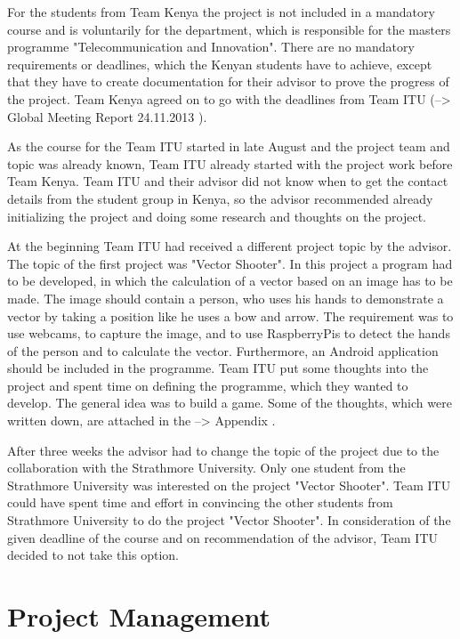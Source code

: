 For the students from Team Kenya the project is not included in a mandatory course and is voluntarily for the department, which is responsible for the masters programme "Telecommunication and Innovation". There are no mandatory requirements or deadlines, which the Kenyan students have to achieve, except that they have to create documentation for their advisor to prove the progress of the project. Team Kenya agreed on to go with the deadlines from Team ITU (--> Global Meeting Report 24.11.2013 ).

As the course for the Team ITU started in late August and the project team and topic was already known, Team ITU already started with the project work before Team Kenya. Team ITU and their advisor did not know when to get the contact details from the student group in Kenya, so the advisor recommended already initializing the project and doing some research and thoughts on the project.

At the beginning Team ITU had received a different project topic by the advisor. The topic of the first project was "Vector Shooter". In this project a program had to be developed, in which the calculation of a vector based on an image has to be made. The image should contain a person, who uses his hands to demonstrate a vector by taking a position like he uses a bow and arrow. The requirement was to use webcams, to capture the image, and to use RaspberryPis to detect the hands of the person and to calculate the vector. Furthermore, an Android application should be included in the programme. Team ITU put some thoughts into the project and spent time on defining the programme, which they wanted to develop. The general idea was to build a game. Some of the thoughts, which were written down, are attached in the --> Appendix .

After three weeks the advisor had to change the topic of the project due to the collaboration with the Strathmore University. Only one student from the Strathmore University was interested on the project "Vector Shooter". Team ITU could have spent time and effort in convincing the other students from Strathmore University to do the project "Vector Shooter". In consideration of the given deadline of the course and on recommendation of the advisor, Team ITU decided to not take this option.


\section{Project Management}

